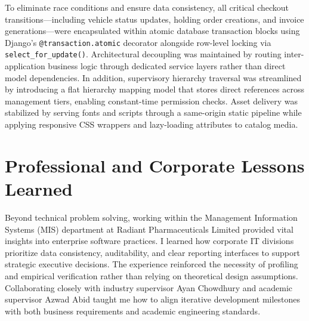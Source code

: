 To eliminate race conditions and ensure data consistency, all critical checkout transitions—including vehicle status updates, holding order creations, and invoice generations—were encapsulated within atomic database transaction blocks using Django's \texttt{@transaction.atomic} decorator alongside row-level locking via \texttt{select\_for\_update()}. Architectural decoupling was maintained by routing inter-application business logic through dedicated service layers rather than direct model dependencies. In addition, supervisory hierarchy traversal was streamlined by introducing a flat hierarchy mapping model that stores direct references across management tiers, enabling constant-time permission checks. Asset delivery was stabilized by serving fonts and scripts through a same-origin static pipeline while applying responsive CSS wrappers and lazy-loading attributes to catalog media.

\section{Professional and Corporate Lessons Learned}
Beyond technical problem solving, working within the Management Information Systems (MIS) department at Radiant Pharmaceuticals Limited provided vital insights into enterprise software practices. I learned how corporate IT divisions prioritize data consistency, auditability, and clear reporting interfaces to support strategic executive decisions. The experience reinforced the necessity of profiling and empirical verification rather than relying on theoretical design assumptions. Collaborating closely with industry supervisor Ayan Chowdhury and academic supervisor Azwad Abid taught me how to align iterative development milestones with both business requirements and academic engineering standards.